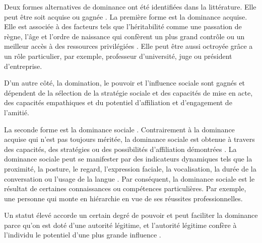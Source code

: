 	Deux formes alternatives de dominance ont été identifiées dans la littérature. Elle peut être soit acquise ou gagnée \cite{liska1990dominance}.
	La première forme est la dominance acquise. Elle est associée à des facteurs tels que l'héritabilité comme une passation de règne, l'âge et l'ordre de naissance qui confèrent un plus grand contrôle ou un meilleur accès à des ressources privilégiées \cite{cattell1970handbook}. Elle peut être aussi octroyée grâce a un rôle particulier, par exemple, professeur d'université, juge ou président d'entreprise.
	

 	D'un autre côté, la domination, le pouvoir et l'influence sociale sont gagnés et dépendent de la sélection de la stratégie sociale et des capacités de mise en acte, des capacités empathiques et du potentiel d'affiliation et d'engagement de l'amitié.
	
	La seconde forme est la dominance sociale \cite{liska1990dominance}. Contrairement à la dominance acquise qui n'est pas toujours méritée, la dominance sociale est obtenue à travers des capacités, des stratégies ou des possibilités d'affiliation démontrées \cite{burgoon1998nature}.  La dominance sociale peut se manifester par des indicateurs dynamiques tels que la proximité, la posture, le regard, l'expression faciale, la vocalisation, la durée de la conversation ou l'usage de la langue \cite{keating1985human}. Par conséquent, la dominance sociale est le résultat de certaines connaissances ou compétences particulières. Par exemple, une personne qui monte en hiérarchie en vue de ses réussites professionnelles.
		
	Un statut élevé accorde un certain degré de pouvoir et peut faciliter la dominance parce qu'on est doté d'une autorité légitime, et l'autorité légitime confère à l'individu le potentiel d'une plus grande influence \cite{burgoon2006nonverbal}. 
	
